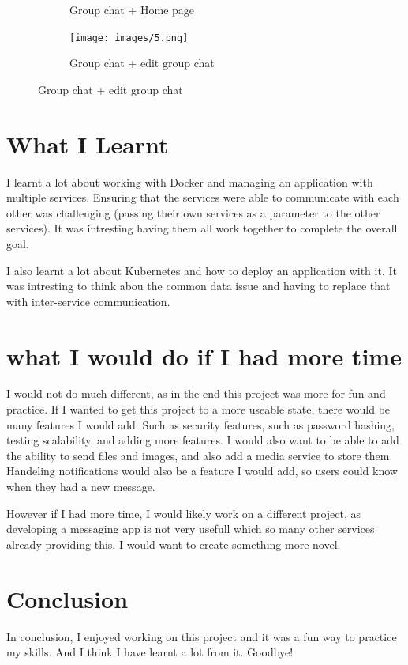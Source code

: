 \documentclass[12pt]{Article}
\begin{document}
\begin{figure}[H]
\begin{subfigure}{0.45\textwidth}
        \caption{Group chat + Home page}
    \end{subfigure}
    \begin{subfigure}{0.45\textwidth}
        \centering
        \texttt{[image: images/5.png]}
        \caption{Group chat + edit group chat}
    \end{subfigure}
\end{figure}


\section{What I Learnt}
I learnt a lot about working with Docker and managing an application with multiple services.
Ensuring that the services were able to communicate with each other was challenging (passing their own services as a parameter to the other services).
It was intresting having them all work together to complete the overall goal.

I also learnt a lot about Kubernetes and how to deploy an application with it.
It was intresting to think abou the common data issue and having to replace that with inter-service communication.


\section{what I would do if I had more time}
I would not do much different, as in the end this project was more for fun and practice.
If I wanted to get this project to a more useable state, there would be many features I would add.
Such as security features, such as password hashing, testing scalability, and adding more features.
I would also want to be able to add the ability to send files and images, and also add a media service to store them.
Handeling notifications would also be a feature I would add, so users could know when they had a new message.

However if I had more time, I would likely work on a different project, as developing a messaging app is not very usefull which so many other services already providing this.
I would want to create something more novel.

\section{Conclusion}
In conclusion, I enjoyed working on this project and it was a fun way to practice my skills.
And I think I have learnt a lot from it.
Goodbye!
\end{document}

